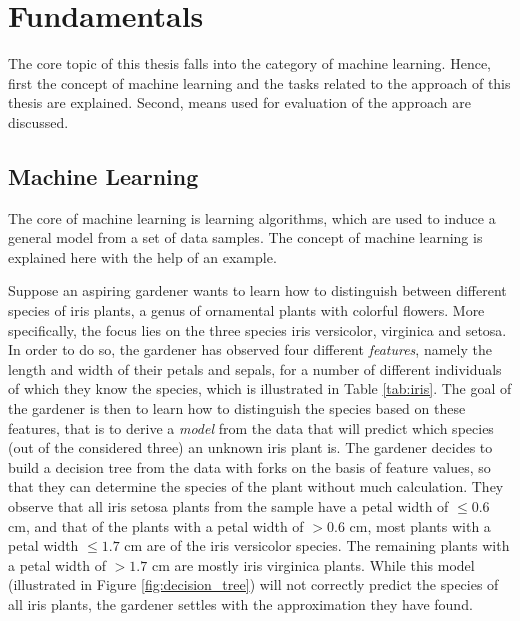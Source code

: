 \chapter{Fundamentals}
\label{sec:fundamentals}

The core topic of this thesis falls into the category of machine learning. Hence, first the concept of machine learning and the tasks related to the approach of this thesis are explained. Second, means used for evaluation of the approach are discussed.

\section{Machine Learning}
The core of machine learning is learning algorithms, which are used to induce a general model from a set of data samples. The concept of machine learning is explained here with the help of an example. %

Suppose an aspiring gardener wants to learn how to distinguish between different species of iris plants, a genus of ornamental plants with colorful flowers. More specifically, the focus lies on the three species iris versicolor, virginica and setosa. In order to do so, the gardener has observed four different \textit{features}, namely the length and width of their petals and sepals, for a number of different individuals of which they know the species, which is illustrated in Table \ref{tab:iris}. The goal of the gardener is then to learn how to distinguish the species based on these features, that is to derive a \textit{model} from the data that will predict which species (out of the considered three) an unknown iris plant is. The gardener decides to build a decision tree from the data with forks on the basis of feature values, so that they can determine the species of the plant without much calculation. They observe that all iris setosa plants from the sample have a petal width of $\leq 0.6 $ cm, and that of the plants with a petal width of $>0.6$ cm, most plants with a petal width $\leq 1.7$ cm are of the iris versicolor species. The remaining plants with a petal width of $>1.7$ cm are mostly iris virginica plants. While this model (illustrated in Figure \ref{fig:decision_tree}) will not correctly predict the species of all iris plants, the gardener settles with the approximation they have found.


